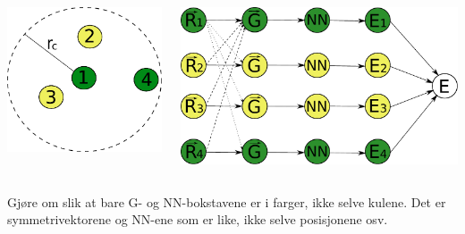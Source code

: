 \documentclass{beamer}
\begin{document}
\begin{frame}

\begin{columns}[c] %
  \begin{column}[c]{0.4\linewidth} %
   \centering
   \includegraphics[width=\linewidth]{../Figures/Presentation/cutoffSphere.pdf}
  \end{column}
  \begin{column}[c]{0.6\linewidth} %
   \includegraphics[width=\linewidth]{../Figures/Presentation/BehlerParrinello.pdf}
  \end{column}
\end{columns}

Gjøre om slik at bare G- og NN-bokstavene er i farger, ikke selve kulene. 
Det er symmetrivektorene og NN-ene som er like, ikke selve posisjonene osv. 

\end{frame}
\end{document}

